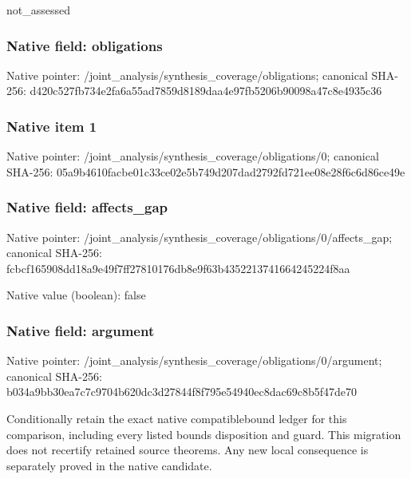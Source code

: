\documentclass[10pt,a4paper]{article}
\begin{document}
not\_assessed


\subsubsection{Native field: obligations}


Native pointer: /joint\_analysis/synthesi\allowbreak{}s\_coverage/obligations; canonical SHA-256: d420c527fb734e2fa6a55ad7\allowbreak{}859d8189daa4e97fb5206b90\allowbreak{}098a47c8e4935c36



\subsubsection{Native item 1}


Native pointer: /joint\_analysis/synthesi\allowbreak{}s\_coverage/obligations/0; canonical SHA-256: 05a9b4610facbe01c33ce02e\allowbreak{}5b749d207dad2792fd721ee0\allowbreak{}8e28f6c6d86ce49e



\subsubsection{Native field: affects\_gap}


Native pointer: /joint\_analysis/synthesi\allowbreak{}s\_coverage/obligations/0\allowbreak{}/affects\_gap; canonical SHA-256: fcbcf165908dd18a9e49f7ff\allowbreak{}27810176db8e9f63b4352213\allowbreak{}741664245224f8aa



Native value (boolean): false



\subsubsection{Native field: argument}


Native pointer: /joint\_analysis/synthesi\allowbreak{}s\_coverage/obligations/0\allowbreak{}/argument; canonical SHA-256: b034a9bb30ea7c7c9704b620\allowbreak{}dc3d27844f8f795e54940ec8\allowbreak{}dac69c8b5f47de70


Conditionally retain the exact native compatiblebound ledger for this comparison, including every listed bounds disposition and guard. This migration does not recertify retained source theorems. Any new local consequence is separately proved in the native candidate.
\end{document}

